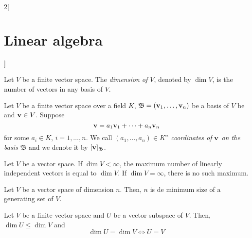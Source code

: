 \documentclass[../../../main.tex]{subfiles}
\begin{document}
\begin{multicols}{2}[\section{Linear algebra}]
\begin{lemma}
    \end{lemma}
    \begin{definition}
        Let $V$ be a finite vector space. The \textit{dimension of $V$}, denoted by $\dim V$, is the number of vectors in any basis of $V$.
    \end{definition}
    \begin{definition}
        Let $V$ be a finite vector space over a field $K$, $\mathfrak{B}=(\boldsymbol{\mathrm{v}}_1,\ldots,\boldsymbol{\mathrm{v}}_n)$ be a basis of $V$ be and $\boldsymbol{\mathrm{v}}\in V$. Suppose $$\boldsymbol{\mathrm{v}}=a_1\boldsymbol{\mathrm{v}}_1+\cdots+a_n\boldsymbol{\mathrm{v}}_n$$ for some $a_i\in K$, $i=1,\ldots,n$. We call $(a_1,\ldots,a_n)\in K^n$ \textit{coordinates of $\boldsymbol{\mathrm{v}}$ on the basis $\mathfrak{B}$} and we denote it by $[\boldsymbol{\mathrm{v}}]_{\mathfrak{B}}$.
    \end{definition}
    \begin{prop}
        Let $V$ be a vector space. If $\dim V<\infty$, the maximum number of linearly independent vectors is equal to $\dim V$. If $\dim V=\infty$, there is no such maximum.
    \end{prop}
    \begin{prop}
        Let $V$ be a vector space of dimension $n$. Then, $n$ is de minimum size of a generating set of $V$.
    \end{prop}
    \begin{prop}
        Let $V$ be a finite vector space and $U$ be a vector subspace of $V$. Then, $\dim U\leq\dim V$ and $$\dim U=\dim V\iff U=V$$
    \end{prop}

\end{multicols}
\end{document}
